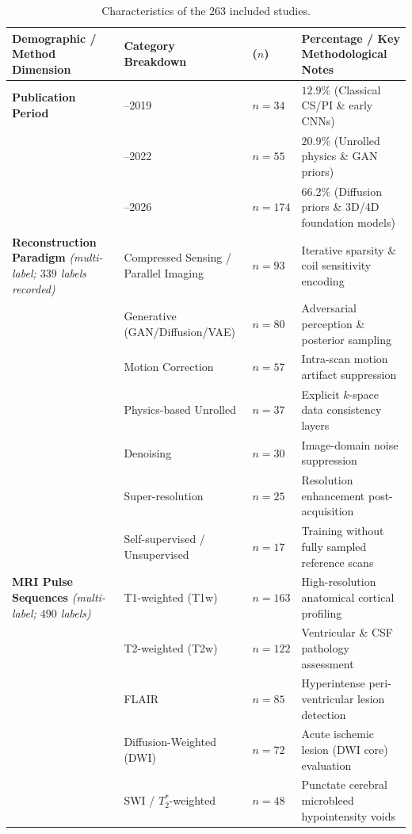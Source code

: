 \documentclass[review,authoryear]{elsarticle}
\begin{document}
\begin{table}[htbp]
\centering
\caption{Characteristics of the 263 included studies.}
\label{tab:characteristics}
\scriptsize
\setlength{\tabcolsep}{3.5pt}
\renewcommand{\arraystretch}{0.98}
\begin{tabular}{>{\raggedright\arraybackslash}p{} >{\raggedright\arraybackslash}p{} l >{\raggedright\arraybackslash}p{}}
\hline
\textbf{Demographic / Method Dimension} & \textbf{Category Breakdown} & \textbf{($n$)} & \textbf{Percentage / Key Methodological Notes} \\
\hline
\textbf{Publication Period} & 1995--2019 & $n=34$ & $12.9\%$ (Classical CS/PI \& early CNNs) \\
 & 2020--2022 & $n=55$ & $20.9\%$ (Unrolled physics \& GAN priors) \\
 & 2023--2026 & $n=174$ & $66.2\%$ (Diffusion priors \& 3D/4D foundation models)  \\
\hline
\textbf{Reconstruction Paradigm} \newline \emph{(multi-label; $339$ labels recorded)} & Compressed Sensing / Parallel Imaging & $n=93$ & Iterative sparsity \& coil sensitivity encoding \\
 & Generative (GAN/Diffusion/VAE) & $n=80$ & Adversarial perception \& posterior sampling \\
 & Motion Correction & $n=57$ & Intra-scan motion artifact suppression \\
 & Physics-based Unrolled & $n=37$ & Explicit $k$-space data consistency layers \\
 & Denoising & $n=30$ & Image-domain noise suppression \\
 & Super-resolution & $n=25$ & Resolution enhancement post-acquisition \\
 & Self-supervised / Unsupervised & $n=17$ & Training without fully sampled reference scans  \\
\hline
\textbf{MRI Pulse Sequences} \newline \emph{(multi-label; $490$ labels)} & T1-weighted (T1w) & $n=163$ & High-resolution anatomical cortical profiling \\
 & T2-weighted (T2w) & $n=122$ & Ventricular \& CSF pathology assessment \\
 & FLAIR & $n=85$ & Hyperintense peri-ventricular lesion detection \\
 & Diffusion-Weighted (DWI) & $n=72$ & Acute ischemic lesion (DWI core) evaluation \\
 & SWI / $T_2^*$-weighted & $n=48$ & Punctate cerebral microbleed hypointensity voids  \\

\end{tabular}
\end{table}
\end{document}
